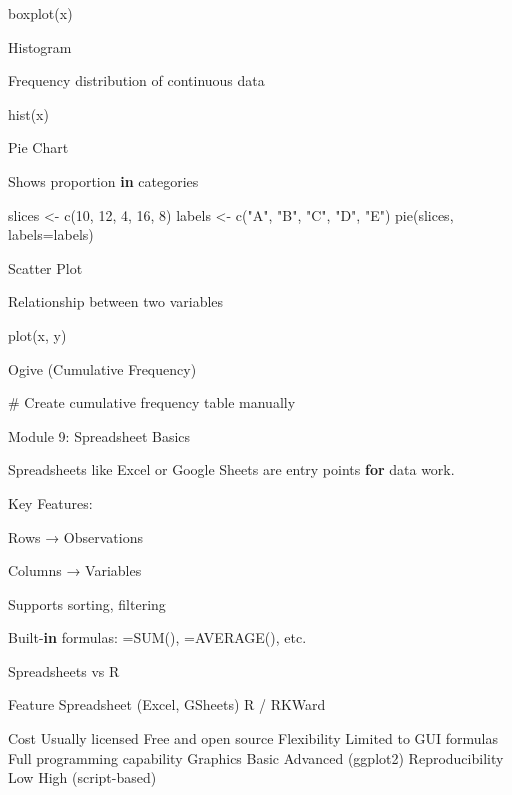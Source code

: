 \documentclass[
  letterpaper,
  DIV=11,
  numbers=noendperiod]{scrreprt}
\newenvironment{Shaded}{\begin{snugshade}}{\end{snugshade}}
\newcommand{\AttributeTok}[1]{\textcolor[rgb]{0.40,0.45,0.13}{#1}}
\newcommand{\CommentTok}[1]{\textcolor[rgb]{0.37,0.37,0.37}{#1}}
\newcommand{\ControlFlowTok}[1]{\textcolor[rgb]{0.00,0.23,0.31}{\textbf{#1}}}
\newcommand{\DecValTok}[1]{\textcolor[rgb]{0.68,0.00,0.00}{#1}}
\newcommand{\ErrorTok}[1]{\textcolor[rgb]{0.68,0.00,0.00}{#1}}
\newcommand{\FunctionTok}[1]{\textcolor[rgb]{0.28,0.35,0.67}{#1}}
\newcommand{\NormalTok}[1]{\textcolor[rgb]{0.00,0.23,0.31}{#1}}
\newcommand{\OtherTok}[1]{\textcolor[rgb]{0.00,0.23,0.31}{#1}}
\newcommand{\SpecialCharTok}[1]{\textcolor[rgb]{0.37,0.37,0.37}{#1}}
\newcommand{\StringTok}[1]{\textcolor[rgb]{0.13,0.47,0.30}{#1}}
\begin{document}
\begin{Shaded}
\begin{Highlighting}[]
\FunctionTok{boxplot}\NormalTok{(x)}

\NormalTok{Histogram}

\NormalTok{Frequency distribution of continuous data}


\FunctionTok{hist}\NormalTok{(x)}

\NormalTok{Pie Chart}

\NormalTok{Shows proportion }\ControlFlowTok{in}\NormalTok{ categories}


\NormalTok{slices }\OtherTok{\textless{}{-}} \FunctionTok{c}\NormalTok{(}\DecValTok{10}\NormalTok{, }\DecValTok{12}\NormalTok{, }\DecValTok{4}\NormalTok{, }\DecValTok{16}\NormalTok{, }\DecValTok{8}\NormalTok{)}
\NormalTok{labels }\OtherTok{\textless{}{-}} \FunctionTok{c}\NormalTok{(}\StringTok{"A"}\NormalTok{, }\StringTok{"B"}\NormalTok{, }\StringTok{"C"}\NormalTok{, }\StringTok{"D"}\NormalTok{, }\StringTok{"E"}\NormalTok{)}
\FunctionTok{pie}\NormalTok{(slices, }\AttributeTok{labels=}\NormalTok{labels)}

\NormalTok{Scatter Plot}

\NormalTok{Relationship between two variables}


\FunctionTok{plot}\NormalTok{(x, y)}

\FunctionTok{Ogive}\NormalTok{ (Cumulative Frequency)}

\CommentTok{\# Create cumulative frequency table manually}

\NormalTok{Module }\DecValTok{9}\SpecialCharTok{:}\NormalTok{ Spreadsheet Basics}

\NormalTok{Spreadsheets like Excel or Google Sheets are entry points }\ControlFlowTok{for}\NormalTok{ data work.}

\NormalTok{Key Features}\SpecialCharTok{:}

\NormalTok{Rows → Observations}

\NormalTok{Columns → Variables}

\NormalTok{Supports sorting, filtering}

\NormalTok{Built}\SpecialCharTok{{-}}\ControlFlowTok{in}\NormalTok{ formulas}\SpecialCharTok{:} \ErrorTok{=}\FunctionTok{SUM}\NormalTok{(), }\OtherTok{=}\FunctionTok{AVERAGE}\NormalTok{(), etc.}

\NormalTok{Spreadsheets vs R}

\NormalTok{Feature }\FunctionTok{Spreadsheet}\NormalTok{ (Excel, GSheets)    R }\SpecialCharTok{/}\NormalTok{ RKWard}

\NormalTok{Cost    Usually licensed    Free and open source}
\NormalTok{Flexibility Limited to GUI formulas Full programming capability}
\NormalTok{Graphics    Basic   }\FunctionTok{Advanced}\NormalTok{ (ggplot2)}
\NormalTok{Reproducibility Low }\FunctionTok{High}\NormalTok{ (script}\SpecialCharTok{{-}}\NormalTok{based)}


\end{Highlighting}
\end{Shaded}
\end{document}
